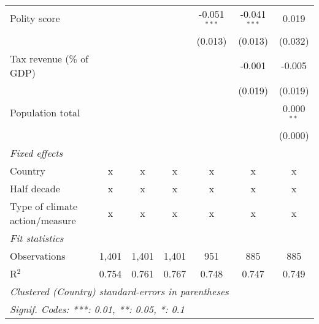 \begin{tabular}{lcccccc}
   Polity score                                                 &         &               &                & -0.051$^{***}$ & -0.041$^{***}$ & 0.019\\   
                                                                &         &               &                & (0.013)        & (0.013)        & (0.032)\\   
   Tax revenue (\% of GDP)                                      &         &               &                &                & -0.001         & -0.005\\   
                                                                &         &               &                &                & (0.019)        & (0.019)\\   
   Population total                                             &         &               &                &                &                & 0.000$^{**}$\\   
                                                                &         &               &                &                &                & (0.000)\\   
   \emph{Fixed effects}\\
   Country                                                      & x       & x             & x              & x              & x              & x\\  
   Half decade                                                  & x       & x             & x              & x              & x              & x\\  
   Type of climate action/measure                               & x       & x             & x              & x              & x              & x\\  
   \midrule \emph{Fit statistics}\\
   Observations                                                 & 1,401   & 1,401         & 1,401          & 951            & 885            & 885\\  
   R$^2$                                                        & 0.754   & 0.761         & 0.767          & 0.748          & 0.747          & 0.749\\  
   \midrule
   \multicolumn{7}{l}{\emph{Clustered (Country) standard-errors in parentheses}}\\
   \multicolumn{7}{l}{\emph{Signif. Codes: ***: 0.01, **: 0.05, *: 0.1}}\\
\end{tabular}
\par\endgroup


